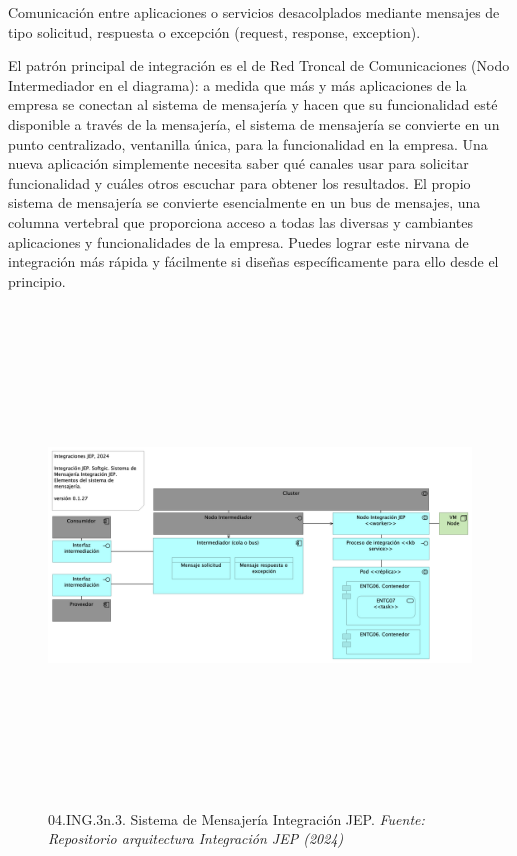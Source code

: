 \documentclass[
  paper=a4,
  ,captions=tableheading
]{scrartcl}
\begin{document}
Comunicación entre aplicaciones o servicios desacolplados mediante
mensajes de tipo solicitud, respuesta o excepción (request, response,
exception).

El patrón principal de integración es el de Red Troncal de
Comunicaciones (Nodo Intermediador en el diagrama): a medida que más y
más aplicaciones de la empresa se conectan al sistema de mensajería y
hacen que su funcionalidad esté disponible a través de la mensajería, el
sistema de mensajería se convierte en un punto centralizado, ventanilla
única, para la funcionalidad en la empresa. Una nueva aplicación
simplemente necesita saber qué canales usar para solicitar funcionalidad
y cuáles otros escuchar para obtener los resultados. El propio sistema
de mensajería se convierte esencialmente en un bus de mensajes, una
columna vertebral que proporciona acceso a todas las diversas y
cambiantes aplicaciones y funcionalidades de la empresa. Puedes lograr
este nirvana de integración más rápida y fácilmente si diseñas
específicamente para ello desde el principio.

\begin{figure}
\centering
\includegraphics[width=\textwidth,height=5.20833in]{images/04.ING.3n.3.SistemadeMensajeríaIntegraciónJEP.png}
\caption{04.ING.3n.3. Sistema de Mensajería Integración JEP.
\emph{Fuente: Repositorio arquitectura Integración JEP
(2024)}}\label{fig:id-402ea0d886a14c76a3459332f1f2953c}
\end{figure}
\end{document}
